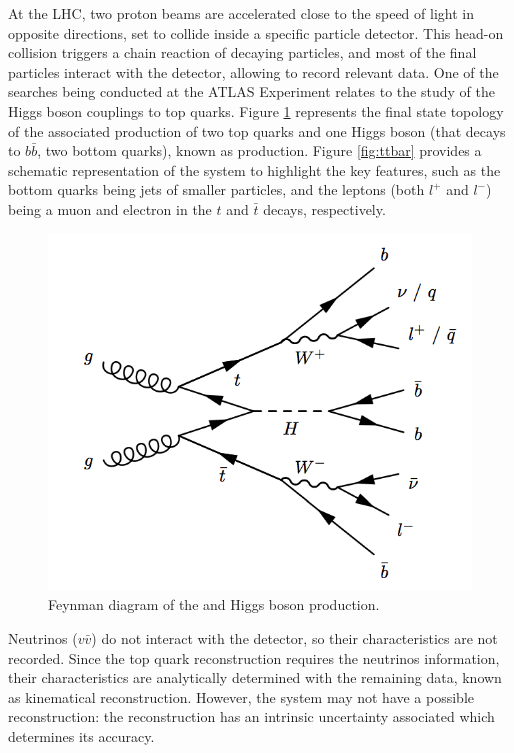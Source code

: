 At the LHC, two proton beams are accelerated close to the speed of light in opposite directions, set to collide inside a specific particle detector. This head-on collision triggers a chain reaction of decaying particles, and most of the final particles interact with the detector, allowing to record relevant data. One of the searches being conducted at the ATLAS Experiment relates to the study of the Higgs boson couplings to top quarks. Figure \ref{fig:ttH} represents the final state topology of the associated production of two top quarks and one Higgs boson (that decays to $b\bar{b}$, two bottom quarks), known as \ttH production. Figure \ref{fig:ttbar} provides a schematic representation of the system to highlight the key features, such as the bottom quarks being jets of smaller particles, and the leptons (both $l^+$ and $l^-$) being a muon and electron in the $t$ and $\bar{t}$ decays, respectively.

\begin{figure}[!htp]
	\begin{center}
		\includegraphics[scale=0.3]{imgs/ttH_feynman.png}
		\caption{Feynman diagram of the \ttbar and Higgs boson production.}
		\label{fig:ttH}
	\end{center}
\end{figure}

Neutrinos ($v\bar{v}$) do not interact with the detector, so their characteristics are not recorded. Since the top quark reconstruction requires the neutrinos information, their characteristics are analytically determined with the remaining data, known as kinematical reconstruction. However, the \ttbar system may not have a possible reconstruction: the reconstruction has an intrinsic uncertainty associated which determines its accuracy.

